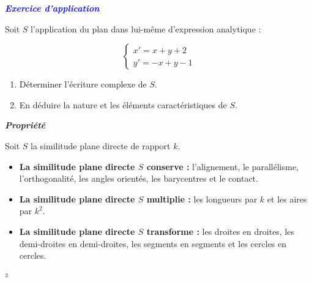 \documentclass[12pt,a4paper]{article}
\begin{document}
\textbf{\textcolor{blue}{\textit{Exercice d’application}}}

\vspace{0.3cm}

Soit \( S \) l’application du plan dans lui-même d’expression analytique :

\[
\begin{cases}
x' = x + y + 2 \\
y' = -x + y - 1
\end{cases}
\]

\begin{enumerate}
    \item Déterminer l’écriture complexe de \( S \).
    
    \item En déduire la nature et les éléments caractéristiques de \( S \).
\end{enumerate}
\textbf{\textit{Propriété}}

\vspace{0.3cm}

Soit \( S \) la similitude plane directe de rapport \( k \).

\begin{itemize}
    \item \textbf{La similitude plane directe \( S \) conserve :} l’alignement, le parallélisme, l’orthogonalité, les angles orientés, les barycentres et le contact.
    
    \item \textbf{La similitude plane directe \( S \) multiplie :} les longueurs par \( k \) et les aires par \( k^2 \).
    
    \item \textbf{La similitude plane directe \( S \) transforme :} les droites en droites, les demi-droites en demi-droites, les segments en segments et les cercles en cercles.
\end{itemize}
²
\end{document}
